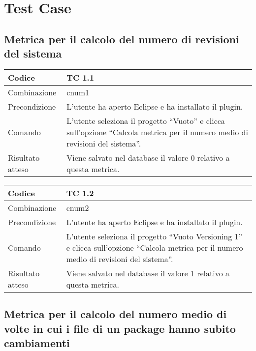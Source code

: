 \chapter{Test Case}

\section{Metrica per il calcolo del numero di revisioni del sistema}

\begin{table}[ht]
\begin{tabular}{|p{3cm}|p{9cm}|}
\hline
\cellcolor{lightgray}Codice				& TC 1.1								\\
\hline
\cellcolor{lightgray}Combinazione		& cnum1									\\
\hline
\cellcolor{lightgray}Precondizione		& L'utente ha aperto Eclipse e ha installato il plugin.		\\
\hline
\cellcolor{lightgray}Comando			& L'utente seleziona il progetto ``Vuoto''  e clicca sull'opzione ``Calcola metrica per il numero medio di revisioni del sistema''.	\\
\hline
\cellcolor{lightgray}Risultato atteso	& Viene salvato nel database il valore 0 relativo a questa metrica.\\
\hline
\end{tabular}
\end{table}

\begin{table}[ht]
\begin{tabular}{|p{3cm}|p{9cm}|}
\hline
\cellcolor{lightgray}Codice				& TC 1.2								\\
\hline
\cellcolor{lightgray}Combinazione		& cnum2									\\
\hline
\cellcolor{lightgray}Precondizione		& L'utente ha aperto Eclipse e ha installato il plugin.		\\
\hline
\cellcolor{lightgray}Comando			& L'utente seleziona il progetto ``Vuoto Versioning 1''  e clicca sull'opzione ``Calcola metrica per il numero medio di revisioni del sistema''.	\\
\hline
\cellcolor{lightgray}Risultato atteso	& Viene salvato nel database il valore 1 relativo a questa metrica.\\
\hline
\end{tabular}
\end{table}
\clearpage

\section{Metrica per il calcolo del numero medio di volte in cui i file di un package hanno subito cambiamenti}

